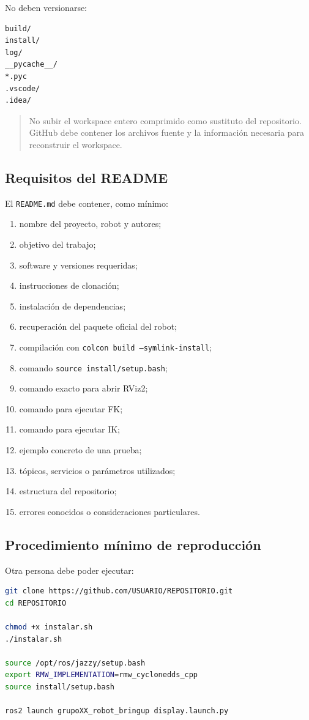 \documentclass[journal]{IEEEtran}
\newcommand{\instr}[1]{%
\begin{quote}
\small
\noindent\textbf{\color{blue}{INSTRUCCIÓN:}} #1
\end{quote}
}
\begin{document}
No deben versionarse:

\begin{lstlisting}
build/
install/
log/
__pycache__/
*.pyc
.vscode/
.idea/
\end{lstlisting}

\instr{No subir el workspace entero comprimido como sustituto del repositorio. GitHub debe contener los archivos fuente y la información necesaria para reconstruir el workspace.}

\subsection{Requisitos del README}

El \texttt{README.md} debe contener, como mínimo:

\begin{enumerate}
    \item nombre del proyecto, robot y autores;
    \item objetivo del trabajo;
    \item software y versiones requeridas;
    \item instrucciones de clonación;
    \item instalación de dependencias;
    \item recuperación del paquete oficial del robot;
    \item compilación con \texttt{colcon build --symlink-install};
    \item comando \texttt{source install/setup.bash};
    \item comando exacto para abrir RViz2;
    \item comando para ejecutar FK;
    \item comando para ejecutar IK;
    \item ejemplo concreto de una prueba;
    \item tópicos, servicios o parámetros utilizados;
    \item estructura del repositorio;
    \item errores conocidos o consideraciones particulares.
\end{enumerate}

\subsection{Procedimiento mínimo de reproducción}

Otra persona debe poder ejecutar:

\begin{lstlisting}[language=bash]
git clone https://github.com/USUARIO/REPOSITORIO.git
cd REPOSITORIO

chmod +x instalar.sh
./instalar.sh

source /opt/ros/jazzy/setup.bash
export RMW_IMPLEMENTATION=rmw_cyclonedds_cpp
source install/setup.bash

ros2 launch grupoXX_robot_bringup display.launch.py
\end{lstlisting}
\end{document}
